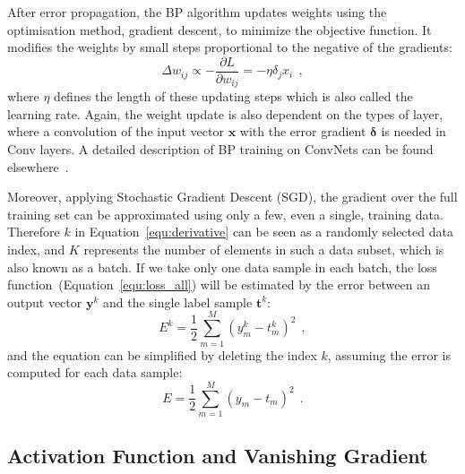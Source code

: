 After error propagation, the BP algorithm updates weights using the optimisation method, gradient descent, to minimize the objective function.
It modifies the weights by small steps proportional to the negative of the gradients:
\begin{equation}
\Delta w_{ij} \propto -\frac{\partial L}{\partial w_{ij}} = -\eta \delta_j x_i~~,
\label{equ:delta_w}
\end{equation}
where $\eta$ defines the length of these updating steps which is also called the learning rate.
Again, the weight update is also dependent on the types of layer, where a convolution of the input vector $\mathbf{x}$ with the error gradient  $\mathbf{\delta}$ is needed in Conv layers.
A detailed description of BP training on ConvNets can be found elsewhere~\citep{bouvrie2006notes}.

Moreover, applying Stochastic Gradient Descent (SGD), the gradient over the full training set can be approximated using only a few, even a single, training data.
Therefore $k$ in Equation~\ref{equ:derivative} can be seen as a randomly selected data index, and $K$ represents the number of elements in such a data subset, which is also known as a batch.
If we take only one data sample in each batch, the loss function~(Equation~\ref{equ:loss_all}) will be estimated by the error between an output vector $\mathbf{y}^k$ and the single label sample $\mathbf{t}^k$:
\begin{equation}
E^k = \frac{1}{2}\sum_{m=1}^M (y^{k}_{m}-t^{k}_{m})^{2}~~,
\label{equ:error_conv}
\end{equation}
and the equation can be simplified by deleting the index $k$, assuming the error is computed for each data sample:
\begin{equation}
E = \frac{1}{2}\sum_{m=1}^M (y_{m}-t_{m})^{2}~~.
\label{equ:error_non}
\end{equation}


\subsection{Activation Function and Vanishing Gradient}


